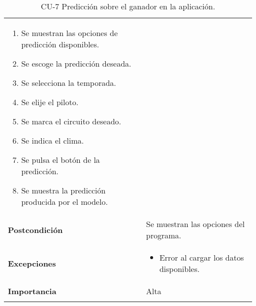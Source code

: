 \begin{longtable}[h!]{@{}ll@{}}
\begin{minipage}[t]{0.71\columnwidth}
\begin{enumerate}
\def\labelenumi{\arabic{enumi}.}
\tightlist
\item
  Se muestran las opciones de predicción disponibles.
\item
  Se escoge la predicción deseada.
\item
  Se selecciona la temporada.
\item
  Se elije el piloto.
\item
  Se marca el circuito deseado.
\item
  Se indica el clima.
\item
  Se pulsa el botón de la predicción.
\item
  Se muestra la predicción producida por el modelo.
\end{enumerate}\strut
\end{minipage}\tabularnewline
\begin{minipage}[t]{0.23\columnwidth}\raggedright\strut
\textbf{Postcondición}\strut
\end{minipage} & \begin{minipage}[t]{0.71\columnwidth}\raggedright\strut
Se muestran las opciones del programa.\strut
\end{minipage}\tabularnewline
\begin{minipage}[t]{0.23\columnwidth}\raggedright\strut
\textbf{Excepciones}\strut
\end{minipage} & \begin{minipage}[t]{0.71\columnwidth}\raggedright\strut
\begin{itemize}
\tightlist
\item
  Error al cargar los datos disponibles.
\end{itemize}\strut
\end{minipage}\tabularnewline
\begin{minipage}[t]{0.23\columnwidth}\raggedright\strut
\textbf{Importancia}\strut
\end{minipage} & \begin{minipage}[t]{0.71\columnwidth}\raggedright\strut
Alta\strut
\end{minipage}\tabularnewline
\bottomrule
\caption{CU-7 Predicción sobre el ganador en la aplicación.}
\end{longtable}


